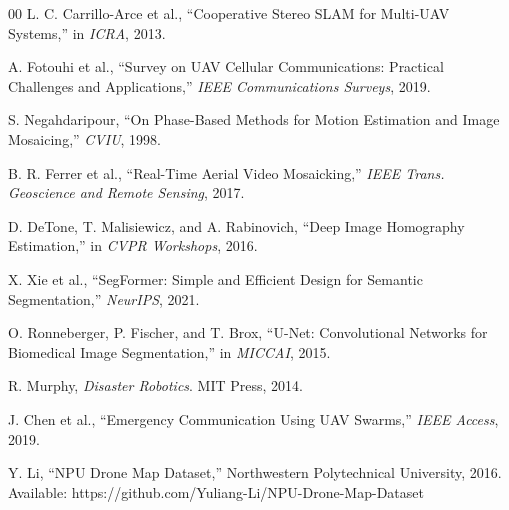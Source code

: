 \documentclass[conference]{IEEEtran}
\begin{document}
\begin{thebibliography}{00}
L. C. Carrillo-Arce et al., ``Cooperative Stereo SLAM for Multi-UAV Systems,'' in \textit{ICRA}, 2013.

A. Fotouhi et al., ``Survey on UAV Cellular Communications: Practical Challenges and Applications,'' \textit{IEEE Communications Surveys}, 2019.

S. Negahdaripour, ``On Phase-Based Methods for Motion Estimation and Image Mosaicing,'' \textit{CVIU}, 1998.

B. R. Ferrer et al., ``Real-Time Aerial Video Mosaicking,'' \textit{IEEE Trans. Geoscience and Remote Sensing}, 2017.

D. DeTone, T. Malisiewicz, and A. Rabinovich, ``Deep Image Homography Estimation,'' in \textit{CVPR Workshops}, 2016.

X. Xie et al., ``SegFormer: Simple and Efficient Design for Semantic Segmentation,'' \textit{NeurIPS}, 2021.

O. Ronneberger, P. Fischer, and T. Brox, ``U-Net: Convolutional Networks for Biomedical Image Segmentation,'' in \textit{MICCAI}, 2015.

R. Murphy, \textit{Disaster Robotics}. MIT Press, 2014.

J. Chen et al., ``Emergency Communication Using UAV Swarms,'' \textit{IEEE Access}, 2019.

Y. Li, ``NPU Drone Map Dataset,'' Northwestern Polytechnical University, 2016. Available: https://github.com/Yuliang-Li/NPU-Drone-Map-Dataset

\end{thebibliography}
\end{document}
